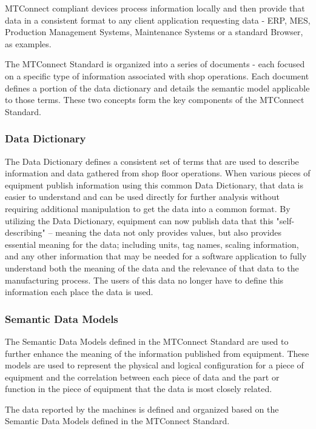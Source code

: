 MTConnect compliant devices process information locally and then provide that data in a consistent format to any client application requesting data - ERP, MES, Production Management Systems, Maintenance Systems or a standard Browser, as examples.

The MTConnect Standard is organized into a series of documents - each focused on a specific type of information associated with shop operations.   Each document defines a portion of the data dictionary and details the semantic model applicable to those terms.   These two concepts form the key components of the MTConnect Standard. 

\subsubsection{Data Dictionary}

The Data Dictionary defines a consistent set of terms that are used to describe information and data gathered from shop floor operations.   When various pieces of equipment publish information using this common Data Dictionary, that data is easier to understand and can be used directly for further analysis without requiring additional manipulation to get the data into a common format.  By utilizing the Data Dictionary, equipment can now publish data that this "self-describing" – meaning the data not only provides values, but also provides essential meaning for the data; including units, tag names, scaling information, and any other information that may be needed for a software application to fully understand both the meaning of the data and the relevance of that data to the manufacturing process.    The users of this data no longer have to define this information each place the data is used. 

\subsubsection{Semantic Data Models}
The Semantic Data Models defined in the MTConnect Standard are used to further enhance the meaning of the information published from equipment.  These models are used to represent the physical and logical configuration for a piece of equipment and the correlation between each piece of data and the part or function in the piece of equipment that the data is most closely related.   

The data reported by the machines is defined and organized based on the Semantic Data Models defined in the MTConnect Standard.   

